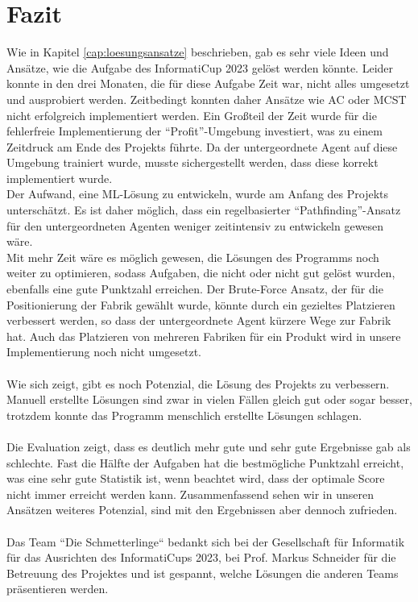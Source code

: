 \section{Fazit}\label{cap:fazit}
Wie in Kapitel \ref{cap:loesungsansatze} beschrieben, gab es sehr viele Ideen und Ansätze, wie die Aufgabe des \mbox{InformatiCup} 2023 gelöst werden könnte. Leider konnte in den drei Monaten, die für diese Aufgabe Zeit war, nicht alles umgesetzt und ausprobiert werden. Zeitbedingt konnten daher Ansätze wie AC oder MCST nicht erfolgreich implementiert werden. Ein Großteil der Zeit wurde für die fehlerfreie Implementierung der  “Profit”-Umgebung  investiert, was zu einem  Zeitdruck am Ende des Projekts führte. Da der untergeordnete Agent auf diese Umgebung trainiert wurde, musste sichergestellt werden, dass diese korrekt implementiert wurde.
\\
Der Aufwand, eine ML-Lösung zu entwickeln, wurde am Anfang des Projekts unterschätzt. Es ist daher möglich, dass ein regelbasierter “Pathfinding”-Ansatz für den untergeordneten Agenten weniger zeitintensiv zu entwickeln gewesen wäre.
\\
Mit mehr Zeit wäre es möglich gewesen, die Lösungen des Programms noch weiter zu optimieren, sodass Aufgaben, die nicht oder nicht gut gelöst wurden, ebenfalls eine gute Punktzahl erreichen. Der Brute-Force Ansatz, der für die Positionierung der Fabrik gewählt wurde, könnte durch ein gezieltes Platzieren verbessert werden, so dass der untergeordnete Agent kürzere Wege zur Fabrik hat. Auch das Platzieren von mehreren Fabriken für ein Produkt wird in unsere Implementierung noch nicht umgesetzt.
\\\\
Wie sich zeigt, gibt es noch Potenzial, die Lösung des Projekts zu verbessern. Manuell erstellte Lösungen sind zwar in vielen Fällen gleich gut oder sogar besser, trotzdem konnte das Programm menschlich erstellte Lösungen schlagen.
\\\\
Die Evaluation zeigt, dass es deutlich mehr gute und sehr gute Ergebnisse gab als schlechte. Fast die Hälfte der Aufgaben hat die bestmögliche Punktzahl erreicht, was eine sehr gute Statistik ist, wenn beachtet wird, dass der optimale Score nicht immer erreicht werden kann. Zusammenfassend sehen wir in unseren Ansätzen weiteres Potenzial, sind mit den Ergebnissen aber dennoch zufrieden.
\\\\
Das Team “Die Schmetterlinge“ bedankt sich bei der Gesellschaft für Informatik für das Ausrichten des InformatiCups 2023, bei Prof. Markus Schneider für die Betreuung des Projektes und ist  gespannt, welche Lösungen die anderen Teams präsentieren werden.
